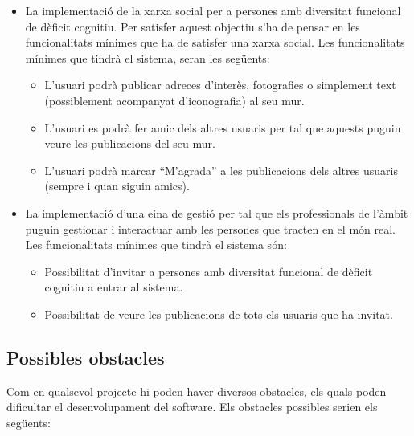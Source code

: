 \documentclass[11pt,catalan,listoffigures,listoftables]{tfgetsinf}
\begin{document}
\begin{itemize}
	\item La implementació de la xarxa social per a persones amb diversitat funcional de dèficit cognitiu. Per satisfer aquest objectiu s’ha de pensar en les funcionalitats mínimes que ha de satisfer una xarxa social. Les funcionalitats mínimes que tindrà el sistema, seran les següents:
	\begin{itemize}
		\item L’usuari podrà publicar adreces d’interès, fotografies o simplement text (possiblement acompanyat d’iconografia) al seu mur.
		\item L’usuari es podrà fer amic dels altres usuaris per tal que aquests puguin veure les publicacions del seu mur.
		\item L’usuari podrà marcar “M’agrada” a les publicacions dels altres usuaris (sempre i quan siguin amics).
	\end{itemize}
	\item La implementació d’una eina de gestió per tal que els professionals de l’àmbit puguin gestionar i interactuar amb les persones que tracten en el món real. Les funcionalitats mínimes que tindrà el sistema són:
	\begin{itemize}
		\item Possibilitat d’invitar a persones amb diversitat funcional de dèficit cognitiu a entrar al sistema.
		\item Possibilitat de veure les publicacions de tots els usuaris que ha invitat.
	\end{itemize}
\end{itemize}

\subsection{Possibles obstacles}

Com en qualsevol projecte hi poden haver diversos obstacles, els quals poden dificultar el desenvolupament del software. Els obstacles possibles serien els següents:
\end{document}
